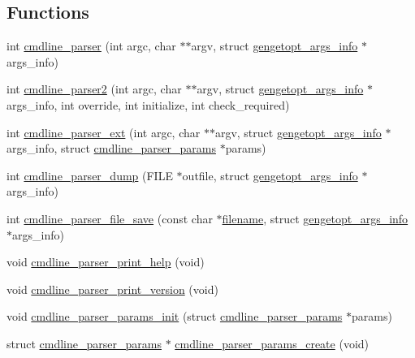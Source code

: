 \subsection*{Functions}
\begin{DoxyCompactItemize}
\item 
int \hyperlink{cuda-sakgengetopt_8h_a3c3df73307452c51fee0a34640d92196}{cmdline\-\_\-parser} (int argc, char $\ast$$\ast$argv, struct \hyperlink{structgengetopt__args__info}{gengetopt\-\_\-args\-\_\-info} $\ast$args\-\_\-info)
\item 
int \hyperlink{cuda-sakgengetopt_8h_a78a0cd581698415a62f68214603b1a30}{cmdline\-\_\-parser2} (int argc, char $\ast$$\ast$argv, struct \hyperlink{structgengetopt__args__info}{gengetopt\-\_\-args\-\_\-info} $\ast$args\-\_\-info, int override, int initialize, int check\-\_\-required)
\item 
int \hyperlink{cuda-sakgengetopt_8h_ac7bb5d76f3f56d1c0b3b531f11ac6f07}{cmdline\-\_\-parser\-\_\-ext} (int argc, char $\ast$$\ast$argv, struct \hyperlink{structgengetopt__args__info}{gengetopt\-\_\-args\-\_\-info} $\ast$args\-\_\-info, struct \hyperlink{structcmdline__parser__params}{cmdline\-\_\-parser\-\_\-params} $\ast$params)
\item 
int \hyperlink{cuda-sakgengetopt_8h_a1f73418092a6e6eb3706aa0de2785e11}{cmdline\-\_\-parser\-\_\-dump} (F\-I\-L\-E $\ast$outfile, struct \hyperlink{structgengetopt__args__info}{gengetopt\-\_\-args\-\_\-info} $\ast$args\-\_\-info)
\item 
int \hyperlink{cuda-sakgengetopt_8h_a5f3e9412f88f1058a31ac28ad2ea2818}{cmdline\-\_\-parser\-\_\-file\-\_\-save} (const char $\ast$\hyperlink{functions_8h_afe162ca7220c61fdaa73e19062942497}{filename}, struct \hyperlink{structgengetopt__args__info}{gengetopt\-\_\-args\-\_\-info} $\ast$args\-\_\-info)
\item 
void \hyperlink{cuda-sakgengetopt_8h_ad4f7db2fa4002379eb30e5206f3b7492}{cmdline\-\_\-parser\-\_\-print\-\_\-help} (void)
\item 
void \hyperlink{cuda-sakgengetopt_8h_a96f27bf35ce0ab8eea7a1f6e6b59a5e2}{cmdline\-\_\-parser\-\_\-print\-\_\-version} (void)
\item 
void \hyperlink{cuda-sakgengetopt_8h_af72b814611cffc706b2135ccdfe7e997}{cmdline\-\_\-parser\-\_\-params\-\_\-init} (struct \hyperlink{structcmdline__parser__params}{cmdline\-\_\-parser\-\_\-params} $\ast$params)
\item 
struct \hyperlink{structcmdline__parser__params}{cmdline\-\_\-parser\-\_\-params} $\ast$ \hyperlink{cuda-sakgengetopt_8h_afd778af110fe0ee1ea5eac7aa9939d92}{cmdline\-\_\-parser\-\_\-params\-\_\-create} (void)
$$
\end{DoxyCompactItemize}

